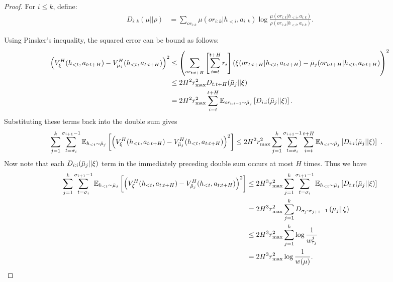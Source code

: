 \begin{proof}
        For $i \leq k$, define:
        \begin{align*}
            D_{i:k} (\mu || \rho) &= \sum_{or_{i:k}} \mu(or_{i:k} | h_{<i}, a_{i:k}) \log \frac{\mu(or_{i:k} | h_{<i}, a_{i:k})}{\rho(or_{i:k} | h_{<i}, a_{i:k})}.
        \end{align*}
    
        Using Pinsker's inequality, the squared error can be bound as follows:
        \begin{align*}
            \left( V_{\xi}^{H}(h_{<t}, a_{t:t+H}) - V_{\bar{\mu}_j}^{H}(h_{<t}, a_{t:t+H}) \right)^2 &\leq
            \left( \sum_{or_{t:t+H}} \left[ \sum_{i=t}^{t+H} r_i \right] \left( \xi(or_{t:t+H} | h_{<t}, a_{t:t+H}) - \bar{\mu}_j(or_{t:t+H} | h_{<t}, a_{t:t+H} \right) \right)^2\\
            &\leq 2 H^2 r_{\max}^2 D_{t:t+H}(\bar{\mu}_j || \xi)\\
            &= 2 H^2 r_{\max}^2 \sum_{i=t}^{t+H} \mathbb{E}_{or_{t:i-1} \sim \bar{\mu}_j} \left[ D_{i:i}(\bar{\mu}_j || \xi) \right].
        \end{align*}
        Substituting these terms back into the double sum gives
        \begin{align*}
            \sum_{j=1}^{k} \sum_{t = \sigma_i}^{\sigma_{i+1}-1} \mathbb{E}_{h_{<t} \sim \bar{\mu}_j} \left[ \left( V_{\xi}^{H}(h_{<t}, a_{t:t+H}) - V_{\bar{\mu}_j}^{H}(h_{<t}, a_{t:t+H}) \right)^2 \right] &\leq
            2 H^2 r_{\max}^2  \sum_{j=1}^{k} \sum_{t = \sigma_i}^{\sigma_{i+1}-1} \sum_{i=t}^{t+H} \mathbb{E}_{h_{<i} \sim \bar{\mu}_j} \left[ D_{i:i}(\bar{\mu}_j || \xi) \right]~.
        \end{align*}
        Now note that each $D_{i:i}(\bar{\mu}_j || \xi)$ term in the immediately preceding double sum occurs at most $H$ times. Thus we have
        \begin{align*}
            \sum_{j=1}^{k} \sum_{t = \sigma_i}^{\sigma_{i+1}-1} \mathbb{E}_{h_{<t} \sim \bar{\mu}_j} \left[ \left( V_{\xi}^{H}(h_{<t}, a_{t:t+H}) - V_{\bar{\mu}_j}^{H}(h_{<t}, a_{t:t+H}) \right)^2\right] &\leq 2 H^3 r_{\max}^2 \sum_{j=1}^{k} \sum_{t=\sigma_i}^{\sigma_{i+1}-1} \mathbb{E}_{h_{<t} \sim \bar{\mu}_j} \left[ D_{t:t}(\bar{\mu}_j || \xi) \right]\\
            &= 2 H^3 r_{\max}^2 \sum_{j=1}^{k} D_{\sigma_j:\sigma_{j+1}-1} \left( \bar{\mu}_j || \xi \right)\\
            &\leq 2 H^3 r_{\max}^2 \sum_{j=1}^{k} \log \frac{1}{w_{\tau_j}^{j}}\\
            &= 2 H^3 r_{\max}^2 \log \frac{1}{w(\mu)}.
        \end{align*}
    \end{proof}
    
